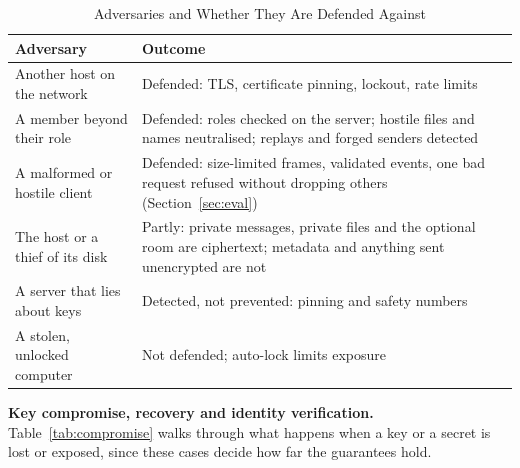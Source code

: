 \documentclass[conference]{IEEEtran}
\begin{document}
\begin{table}[t]
\centering
\caption{Adversaries and Whether They Are Defended Against}
\label{tab:threat}
\footnotesize
\begin{tabularx}{\columnwidth}{@{}>{\raggedright\arraybackslash}p{2.3cm} Y@{}}
\toprule
\textbf{Adversary} & \textbf{Outcome} \\
\midrule
Another host on the network & Defended: TLS, certificate pinning, lockout, rate limits \\
A member beyond their role & Defended: roles checked on the server; hostile files and names neutralised; replays and forged senders detected \\
A malformed or hostile client & Defended: size-limited frames, validated events, one bad request refused without dropping others (Section~\ref{sec:eval}) \\
The host or a thief of its disk & Partly: private messages, private files and the optional room are ciphertext; metadata and anything sent unencrypted are not \\
A server that lies about keys & Detected, not prevented: pinning and safety numbers \\
A stolen, unlocked computer & Not defended; auto-lock limits exposure \\
\bottomrule
\end{tabularx}
\end{table}

\textbf{Key compromise, recovery and identity verification.} Table~\ref{tab:compromise} walks through what happens when a key or a secret is lost or exposed, since these cases decide how far the guarantees hold.
\end{document}
